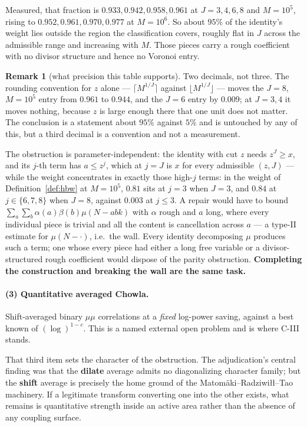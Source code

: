 \documentclass[11pt,a4paper]{article}
\theoremstyle{plain}
\theoremstyle{definition}
\newtheorem{remark}[theorem]{Remark}
\begin{document}
Measured, that fraction is $0.933, 0.942, 0.958, 0.961$ at
$J = 3, 4, 6, 8$ and $M = 10^5$, rising to $0.952, 0.961, 0.970,
0.977$ at $M = 10^6$. So about $95\%$ of the identity's weight lies
outside the region the classification covers, roughly flat in $J$
across the admissible range and increasing with $M$. Those pieces
carry a rough coefficient with no divisor structure and hence no
Voronoi entry.

\begin{remark}[what precision this table supports]
Two decimals, not three. The rounding convention for $z$ alone ---
$\lceil M^{1/J}\rceil$ against $\lfloor M^{1/J}\rfloor$ --- moves the
$J=8$, $M=10^5$ entry from $0.961$ to $0.944$, and the $J=6$ entry by
$0.009$; at $J = 3, 4$ it moves nothing, because $z$ is large enough
there that one unit does not matter. The conclusion is a statement
about $95\%$ against $5\%$ and is untouched by any of this, but a
third decimal is a convention and not a measurement.
\end{remark}

The obstruction is parameter-independent: the identity with cut $z$
needs $z^J \ge x$, and its $j$-th term has $a \le z^j$, which at
$j = J$ is $x$ for every admissible $(z,J)$ --- while the weight
concentrates in exactly those high-$j$ terms: in the weight of
Definition~\ref{def:hbw} at $M=10^5$, $0.81$ sits at $j=3$ when
$J=3$, and $0.84$ at $j \in \{6,7,8\}$ when $J=8$, against $0.003$ at
$j\le3$. A repair would have
to bound $\sum_a\sum_b \alpha(a)\beta(b)\mu(N-abk)$ with $\alpha$
rough and $a$ long, where every individual piece is trivial and all
the content is cancellation across $a$ --- a type-II estimate for
$\mu(N-\cdot)$, i.e.\ the wall. Every identity decomposing $\mu$
produces such a term; one whose every piece had either a long free
variable or a divisor-structured rough coefficient would dispose of
the parity obstruction. \textbf{Completing the construction and
breaking the wall are the same task.}

\paragraph{(3) Quantitative averaged Chowla.} Shift-averaged binary
$\mu\mu$ correlations at a \emph{fixed} log-power saving, against a
best known of $(\log)^{1-c}$. This is a named external open problem
and is where C-III stands.

That third item sets the character of the obstruction. The
adjudication's central finding was that the \textbf{dilate} average
admits no diagonalizing character family; but the \textbf{shift}
average is precisely the home ground of the
Matom\"aki--Radziwi\l\l--Tao machinery. If a legitimate transform
converting one into the other exists, what remains is quantitative
strength inside an active area rather than the absence of any coupling
surface.
\end{document}
